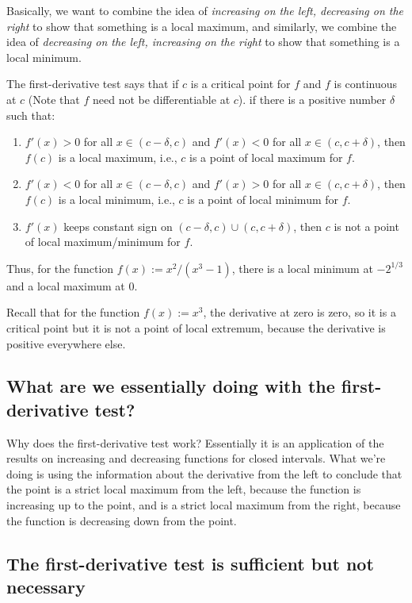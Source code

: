 \documentclass[10pt]{amsart}
\begin{document}
Basically, we want to combine the idea of {\em increasing on the left,
  decreasing on the right} to show that something is a local maximum,
  and similarly, we combine the idea of {\em decreasing on the left,
  increasing on the right} to show that something is a local minimum.

The first-derivative test says that if $c$ is a critical point for $f$
and $f$ is continuous at $c$ (Note that $f$ need not be differentiable
at $c$). if there is a positive number $\delta$ such that:

\begin{enumerate}
\item $f'(x) > 0$ for all $x \in (c -\delta, c)$ and $f'(x) < 0$ for
  all $x \in (c,c+\delta)$, then $f(c)$ is a local maximum, i.e., $c$
  is a point of local maximum for $f$.
\item $f'(x) < 0$ for all $x \in (c - \delta,c)$ and $f'(x) > 0$ for
  all $x \in (c,c+\delta)$, then $f(c)$ is a local minimum, i.e., $c$
  is a point of local minimum for $f$.
\item $f'(x)$ keeps constant sign on $(c - \delta,c) \cup
  (c,c+\delta)$, then $c$ is not a point of local maximum/minimum for
  $f$.
\end{enumerate}

Thus, for the function $f(x) := x^2/(x^3 - 1)$, there is a local
minimum at $-2^{1/3}$ and a local maximum at $0$.

Recall that for the function $f(x) := x^3$, the derivative at zero is
zero, so it is a critical point but it is not a point of local
extremum, because the derivative is positive everywhere else.

\subsection{What are we essentially doing with the first-derivative test?}

Why does the first-derivative test work? Essentially it is an
application of the results on increasing and decreasing functions for
closed intervals. What we're doing is using the information about the
derivative from the left to conclude that the point is a strict local
maximum from the left, because the function is increasing up to the
point, and is a strict local maximum from the right, because the
function is decreasing down from the point.

\subsection{The first-derivative test is sufficient but not necessary}
\end{document}
